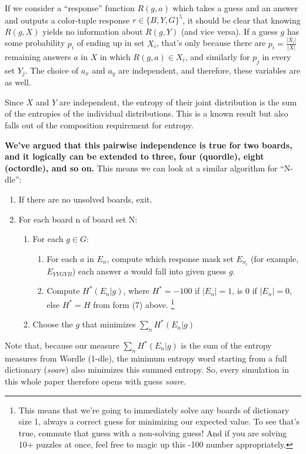 \documentclass[11pt, oneside]{article} 	%
\begin{document}
If we consider a ``response'' function $R(g, a)$ which takes a guess and an answer and outputs a color-tuple response $r \in \{B, Y, G\}^5$, it should be clear that knowing $R(g, X)$ yields no information about $R(g, Y)$ (and vice versa). If a guess $g$ has some probability $p_i$ of ending up in set $X_i$, that's only because there are $p_i = \frac{|X_i|}{|X|}$ remaining answers $a$ in $X$ in which $R(g, a) \in X_i$, and similarly for $p_j$ in every set $Y_j$. The choice of $a_x$ and $a_y$ are independent, and therefore, these variables are as well.

Since $X$ and $Y$ are independent, the entropy of their joint distribution is the sum of the entropies of the individual distributions. This is a known result \cite{3} but also falls out of the composition requirement for entropy.


\textbf{We've argued that this pairwise independence is true for two boards, and it logically can be extended to three, four (quordle), eight (octordle), and so on.} This means we can look at a similar algorithm for ``N-dle'':

\begin{enumerate}
\item If there are no unsolved boards, exit.
\item For each board n of board set N:
 \begin{enumerate}
 \item For each $g \in G$: 
 \begin{enumerate}
 \item For each $a$ in $E_n$, compute which response mask set $E_{n_i}$ (for example, $E_{YYGYB}$) each answer $a$ would fall into given guess $g$.
 \item Compute $H^*(E_n | g)$, where $H^* = -100$ if $|E_n| = 1$, is 0 if $|E_n| = 0$, else $H^* = H$ from form (7) above. \footnote{This means that we're going to immediately solve any boards of dictionary size 1, always a correct guess for minimizing our expected value. To see that's true, commute that guess with a non-solving guess! And if you are solving 10+ puzzles at once, feel free to magic up this -100 number appropriately.}
 \end{enumerate}
 \item Choose the $g$ that minimizes $\sum_{n}H^*(E_n | g)$ 
\end{enumerate}
\end{enumerate}

Note that, because our measure $\sum_{n}H^*(E_n | g)$ is the sum of the entropy measures from Wordle (1-dle), the minimum entropy word starting from a full dictionary (\emph{soare}) also minimizes this summed entropy. So, every simulation in this whole paper therefore opens with guess \emph{soare}.
\end{document}
